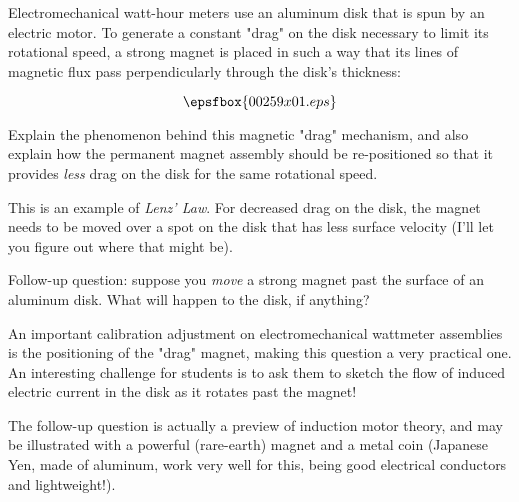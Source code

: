 

Electromechanical watt-hour meters use an aluminum disk that is spun by an electric motor.  To generate a constant "drag" on the disk necessary to limit its rotational speed, a strong magnet is placed in such a way that its lines of magnetic flux pass perpendicularly through the disk's thickness:

$$\epsfbox{00259x01.eps}$$

Explain the phenomenon behind this magnetic "drag" mechanism, and also explain how the permanent magnet assembly should be re-positioned so that it provides {\it less} drag on the disk for the same rotational speed.







This is an example of {\it Lenz' Law}.  For decreased drag on the disk, the magnet needs to be moved over a spot on the disk that has less surface velocity (I'll let you figure out where that might be).

\vskip 10pt

Follow-up question: suppose you {\it move} a strong magnet past the surface of an aluminum disk.  What will happen to the disk, if anything?







An important calibration adjustment on electromechanical wattmeter assemblies is the positioning of the "drag" magnet, making this question a very practical one.  An interesting challenge for students is to ask them to sketch the flow of induced electric current in the disk as it rotates past the magnet!

The follow-up question is actually a preview of induction motor theory, and may be illustrated with a powerful (rare-earth) magnet and a metal coin (Japanese Yen, made of aluminum, work very well for this, being good electrical conductors and lightweight!).




